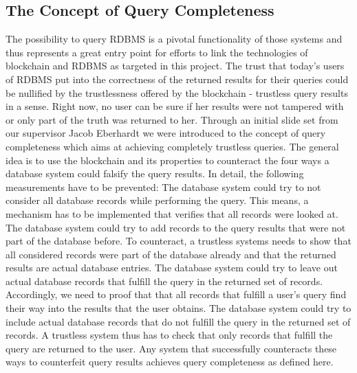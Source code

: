 \subsection{The Concept of Query Completeness}
The possibility to query RDBMS is a pivotal functionality of those systems and thus represents a great entry point for efforts to link the technologies of blockchain and RDBMS as targeted in this project. The trust that today’s users of RDBMS put into the correctness of the returned results for their queries could be nullified by the trustlessness offered by the blockchain - trustless query results in a sense. Right now, no user can be sure if her results were not tampered with or only part of the truth was returned to her.
Through an initial slide set from our supervisor Jacob Eberhardt we were introduced to the concept of query completeness which aims at achieving completely trustless queries. The general idea is to use the blockchain and its properties to counteract the four ways a database system could falsify the query results. In detail, the following measurements have to be prevented:
The database system could try to not consider all database records while performing the query. This means, a mechanism has to be implemented that verifies that all records were looked at.
The database system could try to add records to the query results that were not part of the database before. To counteract, a trustless systems needs to show that all considered records were part of the database already and that the returned results are actual database entries.
The database system could try to leave out actual database records that fulfill the query in the returned set of records. Accordingly, we need to proof that that all records that fulfill a user’s query find their way into the results that the user obtains.
The database system could try to include actual database records that do not fulfill the query in the returned set of records. A trustless system thus has to check that only records that fulfill the query are returned to the user.
Any system that successfully counteracts these ways to counterfeit query results achieves query completeness as defined here.
